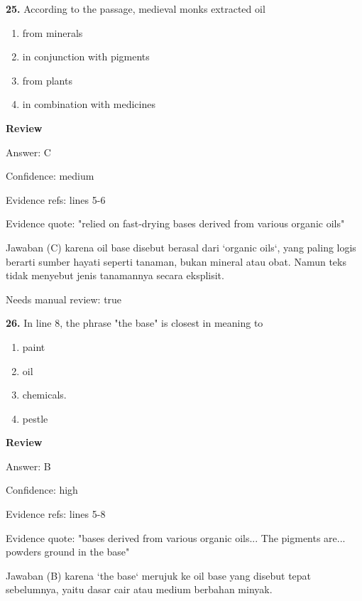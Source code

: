 \documentclass[12pt]{article}
\begin{document}
\endgroup
\par
\vspace{0.25\baselineskip}
\noindent\textbf{25.} According to the passage, medieval monks extracted oil
\begin{enumerate}[label=(\Alph*),leftmargin=*,itemsep=0.2em]
\item from minerals
\item in conjunction with pigments
\item from plants
\item in combination with medicines
\end{enumerate}
\par
\begingroup
\setlength{\parskip}{0pt}
\setlength{\parindent}{0pt}
\textbf{Review}\par
Answer: C\par
Confidence: medium\par
Evidence refs: lines 5-6\par
Evidence quote: "relied on fast-drying bases derived from various organic oils"\par
Jawaban (C) karena oil base disebut berasal dari `organic oils`, yang paling logis berarti sumber hayati seperti tanaman, bukan mineral atau obat. Namun teks tidak menyebut jenis tanamannya secara eksplisit.\par
Needs manual review: true\par
\endgroup
\par
\vspace{0.25\baselineskip}
\noindent\textbf{26.} In line 8, the phrase "the base" is closest in meaning to
\begin{enumerate}[label=(\Alph*),leftmargin=*,itemsep=0.2em]
\item paint
\item oil
\item chemicals.
\item pestle
\end{enumerate}
\par
\begingroup
\setlength{\parskip}{0pt}
\setlength{\parindent}{0pt}
\textbf{Review}\par
Answer: B\par
Confidence: high\par
Evidence refs: lines 5-8\par
Evidence quote: "bases derived from various organic oils... The pigments are... powders ground in the base"\par
Jawaban (B) karena `the base` merujuk ke oil base yang disebut tepat sebelumnya, yaitu dasar cair atau medium berbahan minyak.\par
\end{document}
